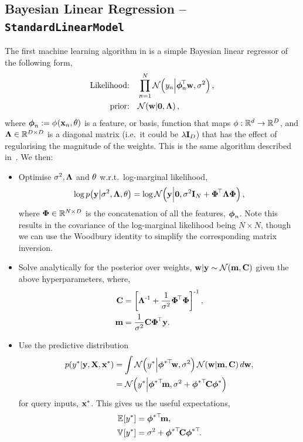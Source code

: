 \documentclass[11pt, oneside]{article}
\begin{document}
\subsection{Bayesian Linear Regression -- \texttt{StandardLinearModel}}

The first machine learning algorithm in \revrand{} is a simple Bayesian linear
regressor of the following form,
\begin{align}
    \text{Likelihood:} \quad &\prod^N_{n=1} 
    \mathcal{N}\!\left({y_n}\middle\vert{\ensuremath{\boldsymbol\phi}_n\ensuremath{^{\!\top}}\ensuremath{\mathbf{w}}, \ensuremath{\sigma^2}}\right), \label{eq:slm_like}\\
    \text{prior:} \quad &\mathcal{N}\!\left({\mathbf{w}}\middle\vert{\mathbf{0}, \ensuremath{\boldsymbol{\Lambda}}}\right),
    \label{eq:slm_prior}
\end{align}
where $\boldsymbol\phi_n := {\phi}_{}\!\left({{\mathbf{x}_n, \theta}}\right)$ is a feature, or basis,
function that maps $\phi : \mathbb{R}^{d} \to \mathbb{R}^{D}$, and $\boldsymbol{\Lambda} \in
\mathbb{R}^{D\times D}$ is a diagonal matrix (i.e.~it could be $\lambda\mathbf{I}_{D}$) that
has the effect of regularising the magnitude of the weights. This is the same
algorithm described in~\citet[Chapter 2]{Rasmussen2006}. We then:
\begin{itemize}
    \item Optimise $\sigma^2, \boldsymbol{\Lambda}$ and $\theta$ w.r.t.\ log-marginal likelihood,
        \begin{equation}
            \log p\!\left({\mathbf{y}}\middle\vert{\ensuremath{\sigma^2}, \ensuremath{\boldsymbol{\Lambda}}, \ensuremath{\theta}}\right) =
            \log \mathcal{N}\!\left({\mathbf{y}}\middle\vert{\mathbf{0}, \ensuremath{\sigma^2}\ensuremath{\mathbf{I}_{N}} + \ensuremath{\boldsymbol\Phi}\ensuremath{^{\!\top}}\ensuremath{\boldsymbol{\Lambda}}\ensuremath{\boldsymbol\Phi}}\right),
        \end{equation}
        where $\boldsymbol\Phi \in \mathbb{R}^{N \times D}$ is the concatenation of all the
        features, $\boldsymbol\phi_n$. Note this results in the covariance of the
        log-marginal likelihood being $N \times N$, though we can use the
        Woodbury identity to simplify the corresponding matrix inversion.
    \item Solve analytically for the posterior over weights, $\mathbf{w} | \mathbf{y}
        \sim \mathcal{N}\!\left({\mathbf{m}, \mathbf{C}}\right)$ given the above hyperparameters, where,
        \begin{align*}
            \mathbf{C} &= \left[{\boldsymbol{\Lambda}^{\text{-}1} + \frac{1}{\sigma^2}
                \boldsymbol\Phi^{\!\top} \boldsymbol\Phi}\right]^{\text{-}1}, \\
            \mathbf{m} &= \frac{1}{\sigma^2} \mathbf{C} \boldsymbol\Phi^{\!\top} \mathbf{y}.
        \end{align*}
    \item Use the predictive distribution
        \begin{align}
            p\!\left({y^{*}}\middle\vert{\ensuremath{\mathbf{y}}, \ensuremath{\mathbf{X}}, \ensuremath{\mathbf{x}}\ensuremath{^{*}}}\right) &= \int
            \mathcal{N}\!\left({y^{*}}\middle\vert{\ensuremath{\boldsymbol\phi}\ensuremath{^{*\top}\!}\ensuremath{\mathbf{w}}, \ensuremath{\sigma^2}}\right)
            \mathcal{N}\!\left({\mathbf{w}}\middle\vert{\ensuremath{\mathbf{m}}, \ensuremath{\mathbf{C}}}\right) d\mathbf{w}, \nonumber \\
            &= \mathcal{N}\!\left({y^{*}}\middle\vert{\ensuremath{\boldsymbol\phi}\ensuremath{^{*\top}\!}\ensuremath{\mathbf{m}},
                \ensuremath{\sigma^2}+ \ensuremath{\boldsymbol\phi}\ensuremath{^{*\top}\!}\ensuremath{\mathbf{C}}\ensuremath{\boldsymbol\phi}\ensuremath{^{*}}}\right)
        \end{align}
        for query inputs, $\mathbf{x}^{*}$. This gives us the useful expectations,
        \begin{align}
            \mathbb{E}_{}\!\left[{y^{*}}\right] &= \boldsymbol\phi^{*\top}\!\mathbf{m}, \\
            \mathbb{V}_{}\!\left[{y^{*}}\right] &= \sigma^2 + \boldsymbol\phi^{*\top}\!\mathbf{C}\boldsymbol\phi^{*\top}\!.
        \end{align}
\end{itemize}
\end{document}
